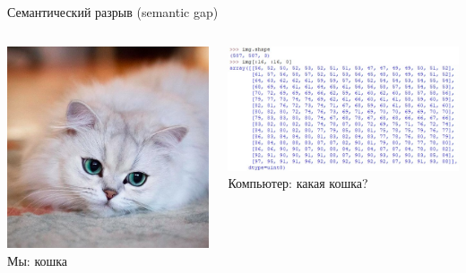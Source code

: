 \documentclass[aspectratio=169, professionalfonts]{beamer}
\begin{document}
\begin{frame}{Семантический разрыв (semantic gap)}
    \begin{columns}
        \begin{column}{.35\linewidth}
            \centering
            \includegraphics[width=\linewidth]{figures/fig7-cat.jpg}
            Мы: кошка
        \end{column}
        \begin{column}{.65\linewidth}
            \centering
            \includegraphics[width=\linewidth]{figures/fig15-rgb.jpg}
            Компьютер: какая кошка?
        \end{column}
    \end{columns}
\end{frame}
\end{document}
